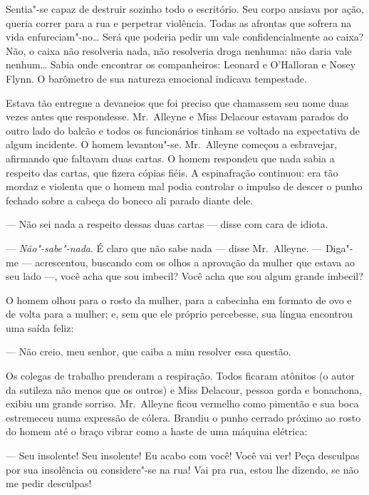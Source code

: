Sentia"-se capaz de destruir sozinho todo o escritório.  Seu corpo ansiava por
ação, queria correr para a rua e perpetrar violência.  Todas as afrontas que
sofrera na vida enfureciam"-no\ldots{}  Será que poderia pedir um vale
confidencialmente ao caixa?  Não, o caixa não resolveria nada, não resolveria
droga nenhuma: não daria vale nenhum\ldots{} Sabia onde encontrar os
companheiros: Leonard e O’Halloran e Nosey Flynn.  O barômetro de sua natureza
emocional indicava tempestade.

Estava tão entregue a devaneios que foi preciso que chamassem seu nome duas
vezes antes que respondesse.  Mr.~Alleyne e Miss Delacour estavam parados do
outro lado do balcão e todos os funcionários tinham se voltado na expectativa
de algum incidente.  O homem levantou"-se.  Mr.~Alleyne começou a esbravejar,
afirmando que faltavam duas cartas.  O homem respondeu que nada sabia a
respeito das cartas, que fizera cópias fiéis.  A espinafração continuou: era
tão mordaz e violenta que o homem mal podia controlar o impulso de descer o
punho fechado sobre a cabeça do boneco ali parado diante dele.

--- Não sei nada a respeito dessas duas cartas --- disse com cara de idiota.

--- \textit{Não"-sabe"-nada}.  É claro que não sabe nada --- disse Mr.~Alleyne.
--- Diga"-me --- acrescentou, buscando com os olhos a aprovação da mulher que
estava ao seu lado ---, você acha que sou imbecil?  Você acha que sou algum
grande imbecil?

O homem olhou para o rosto da mulher, para a cabecinha em formato de ovo e de
volta para a mulher; e, sem que ele próprio percebesse, sua língua encontrou
uma saída feliz:

--- Não creio, meu senhor, que caiba a mim resolver essa questão.

Os colegas de trabalho prenderam a respiração.  Todos ficaram atônitos (o autor
da sutileza não menos que os outros) e Miss Delacour, pessoa gorda e bonachona,
exibiu um grande sorriso.  Mr.~Alleyne ficou vermelho como pimentão e sua boca
estremeceu numa expressão de cólera.  Brandiu o punho cerrado próximo ao rosto
do homem até o braço vibrar como a haste de uma máquina elétrica:

--- Seu insolente!  Seu insolente!  Eu acabo com você!  Você vai ver!  Peça
desculpas por sua insolência ou considere"-se na rua!  Vai pra rua, estou lhe
dizendo, se não me pedir desculpas!

\smallskip

